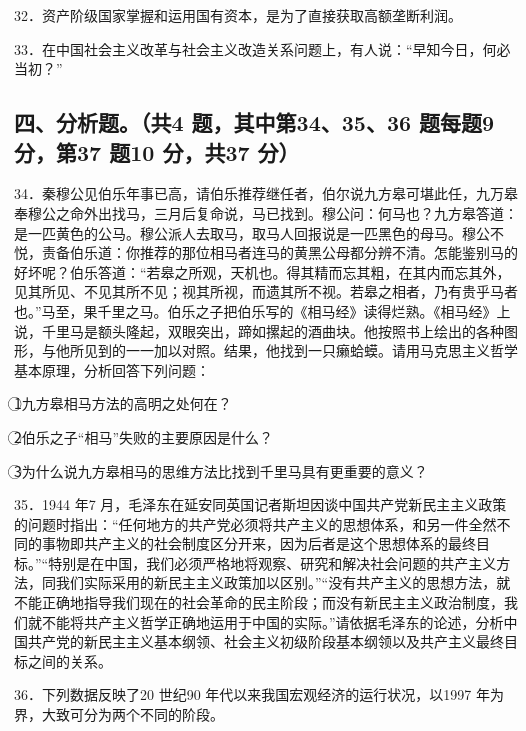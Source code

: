 \documentclass[UTF8,11pt]{ctexart}
\begin{document}
32．资产阶级国家掌握和运用国有资本，是为了直接获取高额垄断利润。


33．在中国社会主义改革与社会主义改造关系问题上，有人说：“早知今日，何必当初？”


\subsection*{四、分析题。（共4 题，其中第34、35、36 题每题9 分，第37 题10 分，共37 分）}

34．秦穆公见伯乐年事已高，请伯乐推荐继任者，伯尔说九方皋可堪此任，九万皋奉穆公之命外出找马，三月后复命说，马已找到。穆公问：何马也？九方皋答道：是一匹黄色的公马。穆公派人去取马，取马人回报说是一匹黑色的母马。穆公不悦，责备伯乐道：你推荐的那位相马者连马的黄黑公母都分辨不清。怎能鉴别马的好坏呢？伯乐答道：“若皋之所观，天机也。得其精而忘其粗，在其内而忘其外，见其所见、不见其所不见；视其所视，而遗其所不视。若皋之相者，乃有贵乎马者也。”马至，果千里之马。伯乐之子把伯乐写的《相马经》读得烂熟。《相马经》上说，千里马是额头隆起，双眼突出，蹄如摞起的酒曲块。他按照书上绘出的各种图形，与他所见到的一一加以对照。结果，他找到一只癞蛤蟆。请用马克思主义哲学基本原理，分析回答下列问题：


\textcircled{1}九方皋相马方法的高明之处何在？


\textcircled{2}伯乐之子“相马”失败的主要原因是什么？


\textcircled{3}为什么说九方皋相马的思维方法比找到千里马具有更重要的意义？


35．1944 年7 月，毛泽东在延安同英国记者斯坦因谈中国共产党新民主主义政策的问题时指出：“任何地方的共产党必须将共产主义的思想体系，和另一件全然不同的事物即共产主义的社会制度区分开来，因为后者是这个思想体系的最终目标。”“特别是在中国，我们必须严格地将观察、研究和解决社会问题的共产主义方法，同我们实际采用的新民主主义政策加以区别。”“没有共产主义的思想方法，就不能正确地指导我们现在的社会革命的民主阶段；而没有新民主主义政治制度，我们就不能将共产主义哲学正确地运用于中国的实际。”请依据毛泽东的论述，分析中国共产党的新民主主义基本纲领、社会主义初级阶段基本纲领以及共产主义最终目标之间的关系。


36．下列数据反映了20 世纪90 年代以来我国宏观经济的运行状况，以1997 年为界，大致可分为两个不同的阶段。
\end{document}
